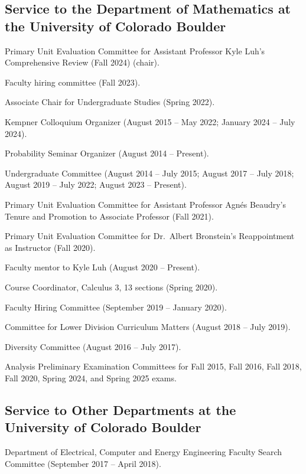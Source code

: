 \documentclass[letterpaper]{article}
\renewenvironment{itemize}{
  \begin{list}{}{
    \setlength{\leftmargin}{1em}
  }
}{
  \end{list}
}
\begin{document}
\subsection*{Service to the Department of Mathematics at the University of Colorado Boulder} 
\begin{itemize}
	\item Primary Unit Evaluation Committee for Assistant Professor Kyle Luh's Comprehensive Review (Fall 2024) (chair). 
	\item Faculty hiring committee (Fall 2023). 
	\item Associate Chair for Undergraduate Studies (Spring 2022). 
	\item Kempner Colloquium Organizer (August 2015 -- May 2022; January 2024 -- July 2024).   
	\item Probability Seminar Organizer (August 2014 -- Present).
	\item Undergraduate Committee (August 2014 -- July 2015; August 2017 -- July 2018; August 2019 -- July 2022; August 2023 -- Present).
	\item Primary Unit Evaluation Committee for Assistant Professor Agn\'{e}s Beaudry's Tenure and Promotion to Associate Professor (Fall 2021).
	\item Primary Unit Evaluation Committee for Dr.\ Albert Bronstein's Reappointment as Instructor (Fall 2020). 
	\item Faculty mentor to Kyle Luh (August 2020 -- Present). 
	\item Course Coordinator, Calculus 3, 13 sections (Spring 2020).  
	\item Faculty Hiring Committee (September 2019 -- January 2020).
	\item Committee for Lower Division Curriculum Matters (August 2018 -- July 2019).  
	\item Diversity Committee (August 2016 -- July 2017).  
	\item Analysis Preliminary Examination Committees for Fall 2015, Fall 2016, Fall 2018, Fall 2020, Spring 2024, and Spring 2025 exams.  
\end{itemize}

\subsection*{Service to Other Departments at the University of Colorado Boulder} 
\begin{itemize}
	\item Department of Electrical, Computer and Energy Engineering Faculty Search Committee (September 2017 -- April 2018).
\end{itemize}
\end{document}

